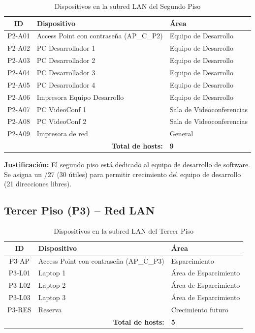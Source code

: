 \documentclass[letterpaper,11pt]{article}
\begin{document}
\begin{table}[H]
\centering
\caption{Dispositivos en la subred LAN del Segundo Piso}
\begin{tabular}{|c|l|l|}
\hline
\textbf{ID} & \textbf{Dispositivo} & \textbf{Área} \\
\hline
P2-A01 & Access Point con contraseña (AP\_C\_P2) & Equipo de Desarrollo \\
P2-A02 & PC Desarrollador 1 & Equipo de Desarrollo \\
P2-A03 & PC Desarrollador 2 & Equipo de Desarrollo \\
P2-A04 & PC Desarrollador 3 & Equipo de Desarrollo \\
P2-A05 & PC Desarrollador 4 & Equipo de Desarrollo \\
P2-A06 & Impresora Equipo Desarrollo & Equipo de Desarrollo \\
P2-A07 & PC VideoConf 1 & Sala de Videoconferencias \\
P2-A08 & PC VideoConf 2 & Sala de Videoconferencias \\
P2-A09 & Impresora de red & General \\
\hline
\multicolumn{2}{|r|}{\textbf{Total de hosts:}} & \textbf{9} \\
\hline
\end{tabular}
\end{table}

\textbf{Justificación:} El segundo piso está dedicado al equipo de desarrollo de software. Se asigna un /27 (30 útiles) para permitir crecimiento del equipo de desarrollo (21 direcciones libres).

\subsection{Tercer Piso (P3) -- Red LAN}


\begin{table}[H]
\centering
\caption{Dispositivos en la subred LAN del Tercer Piso}
\begin{tabular}{|c|l|l|}
\hline
\textbf{ID} & \textbf{Dispositivo} & \textbf{Área} \\
\hline
P3-AP & Access Point con contraseña (AP\_C\_P3) & Esparcimiento \\
P3-L01 & Laptop 1 & Área de Esparcimiento \\
P3-L02 & Laptop 2 & Área de Esparcimiento \\
P3-L03 & Laptop 3 & Área de Esparcimiento \\
P3-RES & Reserva & Crecimiento futuro \\
\hline
\multicolumn{2}{|r|}{\textbf{Total de hosts:}} & \textbf{5} \\
\hline
\end{tabular}
\end{table}
\end{document}
